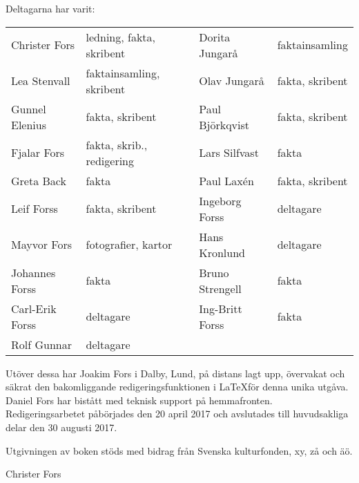 Deltagarna har varit:

\begin{center}
  \begin{tabular}{l l l l}
    Christer Fors & ledning, fakta, skribent & Dorita Jungarå & faktainsamling \\
    Lea Stenvall & faktainsamling, skribent & Olav Jungarå & fakta, skribent \\
    Gunnel Elenius & fakta, skribent & Paul Björkqvist & fakta, skribent \\
    Fjalar Fors & fakta, skrib., redigering & Lars Silfvast & fakta \\
    Greta Back & fakta & Paul Laxén & fakta, skribent \\
    Leif Forss & fakta, skribent & Ingeborg Forss & deltagare \\
    Mayvor Fors & fotografier, kartor & Hans Kronlund & deltagare \\
    Johannes Forss & fakta & Bruno Strengell & fakta \\
    Carl-Erik Forss & deltagare & Ing-Britt Forss & fakta \\
    Rolf Gunnar & deltagare &  &  \\
  \end{tabular}
\end{center}

Utöver dessa har Joakim Fors i Dalby, Lund, på distans lagt upp, övervakat och säkrat den bakomliggande redigeringsfunktionen i  \LaTeX  för denna unika utgåva. Daniel Fors har bistått med teknisk support på hemmafronten. Redigeringsarbetet påbörjades den 20 april 2017 och avslutades till huvudsakliga delar den 30 augusti 2017.

Utgivningen av boken stöds med bidrag från Svenska kulturfonden, xy, zå och äö.


Christer Fors
